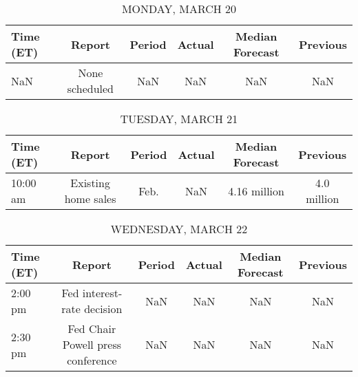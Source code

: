 \documentclass{article}%
\begin{document}
%
\normalsize%


\begin{table}[htbp]%
\caption{MONDAY, MARCH 20}%
\centering%
\begin{adjustbox}{width=1\textwidth}%
\begin{tabular}{lccccc}
\toprule
Time (ET) &         Report & Period & Actual & Median Forecast & Previous \\
\midrule
      NaN & None scheduled &    NaN &    NaN &             NaN &      NaN \\
\bottomrule
\end{tabular}
%
\end{adjustbox}%
\end{table}

%


\begin{table}[htbp]%
\caption{TUESDAY, MARCH 21}%
\centering%
\begin{adjustbox}{width=1\textwidth}%
\begin{tabular}{lccccc}
\toprule
Time (ET) &              Report & Period & Actual & Median Forecast &    Previous \\
\midrule
 10:00 am & Existing home sales &   Feb. &    NaN &    4.16 million & 4.0 million \\
\bottomrule
\end{tabular}
%
\end{adjustbox}%
\end{table}

%


\begin{table}[htbp]%
\caption{WEDNESDAY, MARCH 22}%
\centering%
\begin{adjustbox}{width=1\textwidth}%
\begin{tabular}{lccccc}
\toprule
Time (ET) &                            Report & Period & Actual & Median Forecast & Previous \\
\midrule
  2:00 pm &        Fed interest-rate decision &    NaN &    NaN &             NaN &      NaN \\
  2:30 pm & Fed Chair Powell press conference &    NaN &    NaN &             NaN &      NaN \\
\bottomrule
\end{tabular}
%
\end{adjustbox}%
\end{table}

%
\end{document}
